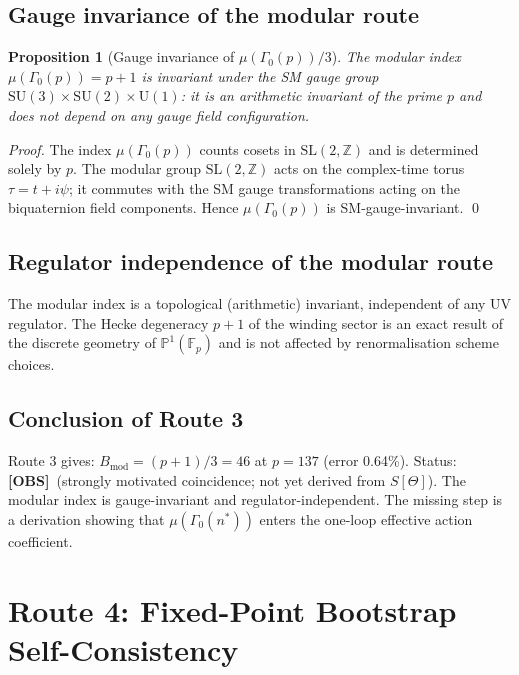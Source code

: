 \documentclass[12pt,a4paper]{article}
\newtheorem{proposition}[theorem]{Proposition}
\theoremstyle{definition}
\theoremstyle{remark}
\newcommand{\obs}{\textcolor{blue!50!black}{\textbf{[OBS]}}}
\begin{document}
\subsection{Gauge invariance of the modular route}

\begin{proposition}[Gauge invariance of $\mu(\Gamma_0(p))/3$]
  The modular index $\mu(\Gamma_0(p)) = p + 1$ is invariant under the SM gauge
  group $\mathrm{SU}(3)\times\mathrm{SU}(2)\times\mathrm{U}(1)$: it is an
  arithmetic invariant of the prime $p$ and does not depend on any gauge field
  configuration.
\end{proposition}

\begin{proof}
  The index $\mu(\Gamma_0(p))$ counts cosets in $\mathrm{SL}(2,\mathbb{Z})$ and
  is determined solely by $p$.  The modular group $\mathrm{SL}(2,\mathbb{Z})$
  acts on the complex-time torus $\tau = t + i\psi$; it commutes with the SM
  gauge transformations acting on the biquaternion field components.  Hence
  $\mu(\Gamma_0(p))$ is SM-gauge-invariant. \qed
\end{proof}

\subsection{Regulator independence of the modular route}

The modular index is a topological (arithmetic) invariant, independent of any
UV regulator.  The Hecke degeneracy $p+1$ of the winding sector is an exact
result of the discrete geometry of $\mathbb{P}^1(\mathbb{F}_p)$ and is not
affected by renormalisation scheme choices.

\subsection{Conclusion of Route 3}

\begin{resultbox}
Route 3 gives: $B_{\mathrm{mod}} = (p+1)/3 = 46$ at $p = 137$ (error 0.64\%).
Status: \obs\ (strongly motivated coincidence; not yet derived from $S[\Theta]$).
The modular index is gauge-invariant and regulator-independent.  The missing
step is a derivation showing that $\mu(\Gamma_0(n^*))$ enters the one-loop
effective action coefficient.
\end{resultbox}

\section{Route 4: Fixed-Point Bootstrap Self-Consistency}
\label{sec:bootstrap}
\end{document}
